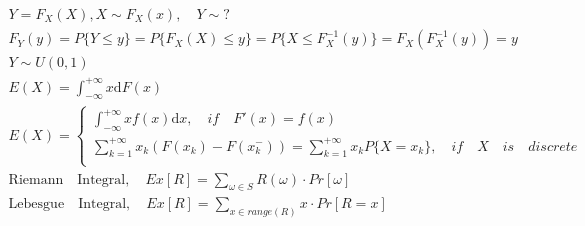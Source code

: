 \documentclass{article}
\begin{document}
\begin{align*}
    Y = F_{X}(X), X \sim F_{X}(x), \quad Y \sim ?\\
    F_{Y}(y) = P\{Y \le y\} = P\{F_{X}(X) \le y\} = P\{X \le F_{X}^{-1}(y)\} = F_{X}(F_{X}^{-1}(y)) = y \\
    Y \sim U(0,1)\\
    E(X) = \int_{-\infty}^{+\infty} x \mathrm{d} F(x) \\
    E(X) = \left\{ 
        \begin{array}{rl}
            \int_{-\infty}^{+\infty}xf(x) \mathrm{d}x, \quad if \quad F'(x)=f(x)\\
            \sum_{k=1}^{+\infty} x_{k} (F(x_{k})-F(x_{k}^{-})) = \sum_{k=1}^{+\infty}x_{k}P\{X=x_{k}\}, \quad if \quad X \quad is \quad discrete\\
        \end{array}
    \right. \\
    \mathrm{Riemann \quad Integral} ,\quad Ex[R] = \sum_{\omega \in S} R(\omega) \cdot Pr[\omega] \\
    \mathrm{Lebesgue \quad Integral} , \quad Ex[R] = \sum_{x \in range(R)} x \cdot Pr[R = x]\\
\end{align*}
\end{document}
